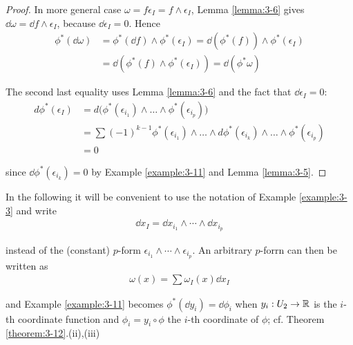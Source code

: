 \begin{proof}
In more general case $\omega = f\epsilon_I = f\wedge\epsilon_I$, Lemma \ref{lemma:3-6} gives  
$\dd\omega = \dd f\wedge\epsilon_I$, because $\dd\epsilon_I = 0$. Hence
\begin{align*}
  \phi^*(\dd\omega) 
  & = \phi^*(\dd f)\wedge\phi^*(\epsilon_I)
      = \dd(\phi^*(f))\wedge\phi^*(\epsilon_I) \\
  & = \dd(\phi^*(f)\wedge\phi^*(\epsilon_I))
    = \dd(\phi^*\omega)
\end{align*}

The second last equality uses Lemma \ref{lemma:3-6} and the fact that $\dd\epsilon_I = 0$:
\begin{align*}
  d\phi^{*}(\epsilon_{I})
  & = d\big(\phi^{*}(\epsilon_{i_{1}})\wedge\ldots\wedge\phi^{*}(\epsilon_{i_{p}})\big) \\
  & = \sum\left(-1\right)^{k-1}\phi^{*}(\epsilon_{i_{1}})\wedge\ldots\wedge d\phi^{*}(\epsilon_{i_{k}})\wedge\ldots\wedge\phi^{*}(\epsilon_{i_{p}})\\
  & = 0
\end{align*}

since $\dd\phi^*(\epsilon_{i_k}) = 0$ by Example \ref{example:3-11} and Lemma \ref{lemma:3-5}.
\end{proof}


In the following it will be convenient to use the notation of Example \ref{example:3-3} and write
\begin{align*}
  \dd x_I = \dd x_{i_1}\wedge\cdots\wedge\dd x_{i_p}
\end{align*}

instead of the (constant) $p$-form $\epsilon_{i_1}\wedge\cdots\wedge\epsilon_{i_p}$. An arbitrary 
$p$-forrn can then be written as
\begin{align*}
  \omega(x) = \sum{\omega_I(x)\dd x_I}
\end{align*}

and Example \ref{example:3-11} becomes $\phi^*(\dd y_i) = \dd\phi_i$ when $y_i:U_2\to\mathbb{R}$ is 
the $i$-th coordinate function and $\phi_i = y_i\circ\phi$ the $i$-th coordinate of $\phi$; 
cf. Theorem \ref{theorem:3-12}.(ii),(iii)

